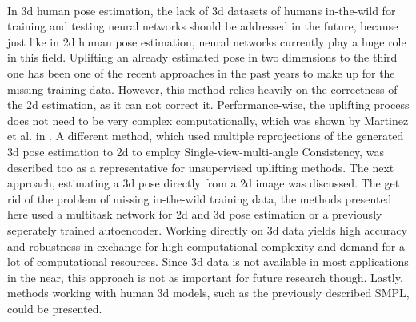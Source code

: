 \\ In 3d human pose estimation, the lack of 3d datasets of humans in-the-wild for training and testing neural networks should be addressed in the future, because just like in 2d human pose estimation, neural networks currently play a huge role in this field. Uplifting an already estimated pose in two dimensions to the third one has been one of the recent approaches in the past years to make up for the missing training data. However, this method relies heavily on the correctness of the 2d estimation, as it can not correct it. Performance-wise, the uplifting process does not need to be very complex computationally, which was shown by Martinez et al. in \cite{Martinez_2017_ICCV}. A different method, which used multiple reprojections of the generated 3d pose estimation to 2d to employ Single-view-multi-angle Consistency, was described too as a representative for unsupervised uplifting methods. The next approach, estimating a 3d pose directly from a 2d image was discussed. The get rid of the problem of missing in-the-wild training data, the methods presented here used a multitask network for 2d and 3d pose estimation or a previously seperately trained autoencoder. Working directly on 3d data yields high accuracy and robustness in exchange for high computational complexity and demand for a lot of computational resources. Since 3d data is not available in most applications in the near, this approach is not as important for future research though. Lastly, methods working with human 3d models, such as the previously described SMPL, could be presented. 